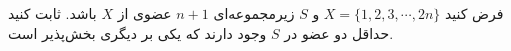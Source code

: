 \EXERCISE
فرض کنید
$X = \{1, 2, 3, \cdots, 2n\}$
و
$S$
زیرمجموعه‌ای
$n + 1$
عضوی از
$X$
باشد. ثابت کنید حداقل دو عضو در
$S$
وجود دارند که یکی بر دیگری بخش‌پذیر است.